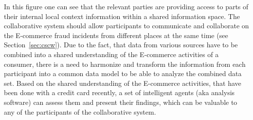 In this figure one can see that the relevant parties are providing access to parts of their internal local context information within a shared information space. The collaborative system should allow participants to communicate and collaborate on the \gls{E-commerce} fraud incidents from different places at the same time (see Section~\ref{sec:cscw}). Due to the fact, that data from various sources have to be combined into a shared understanding of the \gls{E-commerce} activities of a consumer, there is a need to harmonize and transform the information from each participant into a common data model to be able to analyze the combined data set. Based on the shared understanding of the \gls{E-commerce} activities, that have been done with a credit card recently, a set of intelligent agents (aka analysis software) can assess them and present their findings, which can be valuable to any of the participants of the collaborative system.

